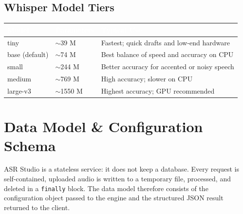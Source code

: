 \documentclass[11pt,a4paper]{article}
\newcommand{\thc}[1]{\textcolor{white}{\bfseries #1}}
\newcommand{\headrow}{\rowcolor{headblue}}
\begin{document}
\subsection{Whisper Model Tiers}
\begin{tabularx}{\textwidth}{|L{2.4cm}|L{2.6cm}|Y|}
\hline
\headrow \thc{Model} & \thc{Parameters} & \thc{Typical Use} \\ \hline
tiny & $\sim$39 M & Fastest; quick drafts and low-end hardware \\ \hline
base (default) & $\sim$74 M & Best balance of speed and accuracy on CPU \\ \hline
small & $\sim$244 M & Better accuracy for accented or noisy speech \\ \hline
medium & $\sim$769 M & High accuracy; slower on CPU \\ \hline
large-v3 & $\sim$1550 M & Highest accuracy; GPU recommended \\ \hline
\end{tabularx}

\section{Data Model \& Configuration Schema}
ASR Studio is a stateless service: it does not keep a database. Every request is self-contained, uploaded audio is written to a temporary file, processed, and deleted in a \texttt{finally} block. The data model therefore consists of the configuration object passed to the engine and the structured JSON result returned to the client.
\end{document}
